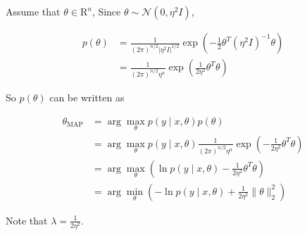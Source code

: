 \begin{answer}
	Assume that $\theta\in \mathrm R^n$, Since $\theta\sim \mathcal N(0, \eta^2I)$,
	
	$$
	\begin{aligned}
		p(\theta) &=\frac{1}{(2\pi)^{n/2}|\eta^2I|^{1/2}}\exp\left(-\frac{1}{2}\theta^T(\eta^2I)^{-1}\theta\right)\\
		&=\frac{1}{(2\pi)^{n/2}\eta^n}\exp\left(\frac{1}{2\eta^2}\theta^T\theta\right)
	\end{aligned}
	$$
	
	So $p(\theta)$ can be written as
	
	$$
	\begin{aligned}
		\theta_{\text{MAP}} & = \arg\max_{\theta} p(y\mid x,\theta)p(\theta)\\
		& = \arg\max_{\theta} p(y\mid x,\theta) \frac{1}{(2\pi)^{n/2}\eta^n}\exp\left(-\frac{1}{2\eta^2}\theta^T\theta\right)\\
		& = \arg\max_{\theta} \left(\ln p(y\mid x,\theta) - \frac{1}{2\eta^2}\theta^T\theta\right)\\
		& = \arg\min_{\theta} \left(-\ln p(y\mid x, \theta) + \frac{1}{2\eta^2}\|\theta\|_2^2\right)
	\end{aligned}
	$$
	
	Note that $\lambda=\frac{1}{2\eta^2}$.
\end{answer}
